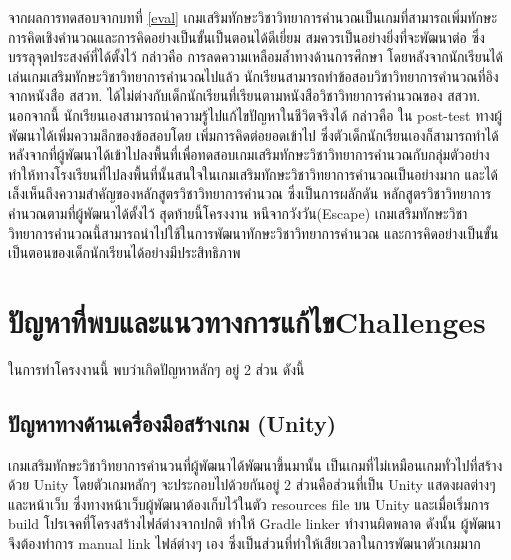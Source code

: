 จากผลการทดสอบจากบทที่ \ref{eval} เกมเสริมทักษะวิชาวิทยาการคำนวณเป็นเกมที่สามารถเพิ่มทักษะการคิดเชิงคำนวณและการคิดอย่างเป็นขั้นเป็นตอนได้ดีเยี่ยม สมควรเป็นอย่างยิ่งที่จะพัฒนาต่อ
ซึ่งบรรลุจุดประสงค์ที่ได้ตั้งไว้ กล่าวคือ การลดความเหลือมล้ำทางด้านการศึกษา โดยหลังจากนักเรียนได้เล่นเกมเสริมทักษะวิชาวิทยาการคำนวณไปแล้ว นักเรียนสามารถทำข้อสอบวิชาวิทยาการคำนวณที่อิงจากหนังสือ สสวท. ได้ไม่ต่างกับเด็กนักเรียนที่เรียนตามหนังสือวิชาวิทยาการคำนวณของ สสวท. 
นอกจากนี้ นักเรียนเองสามารถนำความรู้ไปแก้ไขปัญหาในชีวิตจริงได้ กล่าวคือ ใน post-test ทางผู้พัฒนาได้เพิ่มความลึกของข้อสอบโดย
เพิ่มการคิดต่อยอดเข้าไป ซึ่งตัวเด็กนักเรียนเองก็สามารถทำได้ 
หลังจากที่ผู้พัฒนาได้เข้าไปลงพื้นที่เพื่อทดสอบเกมเสริมทักษะวิชาวิทยาการคำนวณกับกลุ่มตัวอย่าง ทำให้ทางโรงเรียนที่ไปลงพื้นที่นั้นสนใจในเกมเสริมทักษะวิชาวิทยาการคำนวณเป็นอย่างมาก และได้เล็งเห็นถึงความสำคัญของหลักสูตรวิชาวิทยาการคำนวณ ซึ่งเป็นการผลักดัน \newline หลักสูตรวิชาวิทยาการคำนวณตามที่ผู้พัฒนาได้ตั้งไว้
สุดท้ายนี้โครงงาน หนีจากวังวัน(Escape) เกมเสริมทักษะวิชาวิทยาการคำนวณนี้สามารถนำไปใช้ในการพัฒนาทักษะวิชาวิทยาการคำนวณ และการคิดอย่างเป็นขั้น \newline เป็นตอนของเด็กนักเรียนได้อย่างมีประสิทธิภาพ


\section{\ifcpe ปัญหาที่พบและแนวทางการแก้ไข\else Challenges\fi}

ในการทำโครงงานนี้ พบว่าเกิดปัญหาหลักๆ อยู่ 2 ส่วน ดังนี้

\subsection{ปัญหาทางด้านเครื่องมือสร้างเกม (Unity)}
เกมเสริมทักษะวิชาวิทยาการคำนวนที่ผู้พัฒนาได้พัฒนาขึ้นมานั้น เป็นเกมที่ไม่เหมือนเกมทั่วไปที่สร้างด้วย \newline
Unity โดยตัวเกมหลักๆ จะประกอบไปด้วยกันอยู่ 2 ส่วนคือส่วนที่เป็น Unity แสดงผลต่างๆ และหน้าเว็บ ซึ่งทางหน้าเว็บผู้พัฒนาต้องเก็บไว้ในตัว resources file
บน Unity และเมื่อเริ่มการ build โปรเจคที่โครงสร้างไฟล์ต่างจากปกติ ทำให้ Gradle linker ทำงานผิดพลาด ดังนั้น ผู้พัฒนาจึงต้องทำการ manual link ไฟล์ต่างๆ เอง
ซึ่งเป็นส่วนที่ทำให้เสียเวลาในการพัฒนาตัวเกมมาก

